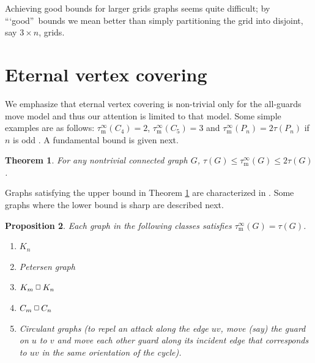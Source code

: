 \documentclass[12pt]{article}%
\newtheorem{theorem}{Theorem}[section]
\newtheorem{proposition}[theorem]{Proposition}
\providecommand{\boksie}{\ensuremath{\mathbin{\raisebox{0.3mm}{$\scriptstyle\square$}}}}
\begin{document}
Achieving good bounds for larger grids graphs seems quite difficult; by
\textquotedblleft`good\textquotedblright\ bounds we mean better than simply
partitioning the grid into disjoint, say $3\times n$, grids.

\section{Eternal vertex covering}

\label{Sec_EVC}

We emphasize that eternal vertex covering is non-trivial only for the
all-guards move model and thus our attention is limited to that model. Some
simple examples are as follows: $\tau_{\mathrm{m}}^{\infty}(C_{4})=2$,
$\tau_{\mathrm{m}}^{\infty}(C_{5})=3$ and $\tau_{\mathrm{m}}^{\infty}%
(P_{n})=2\tau(P_{n})$ if $n$ is odd \cite{KM5}. A fundamental bound is given next.

\begin{theorem}
\emph{\cite{KM5}}\label{alphabounds}\hspace{0.1in}For any nontrivial connected
graph $G$, $\tau(G)\leq\tau_{\mathrm{m}}^{\infty}(G)\leq2\tau(G)$.
\end{theorem}

Graphs satisfying the upper bound in Theorem \ref{alphabounds} are
characterized in \cite{KM5}. Some graphs where the lower bound is sharp are
described next.

\begin{proposition}
Each graph in the following classes satisfies $\tau_{\mathrm{m}}^{\infty
}(G)=\tau(G)$.

\begin{enumerate}
\item[\emph{(a)}] $K_{n}$

\item[\emph{(b)}] Petersen graph

\item[\emph{(c)}] $K_{m}\boksie K_{n}$

\item[\emph{(d)}] $C_{m}\boksie C_{n}$

\item[\emph{(e)}] Circulant graphs (to repel an attack along the edge $uv$,
move (say) the guard on $u$ to $v$ and move each other guard along its
incident edge that corresponds to $uv$ in the same orientation of the cycle).
\end{enumerate}
\end{proposition}
\end{document}
